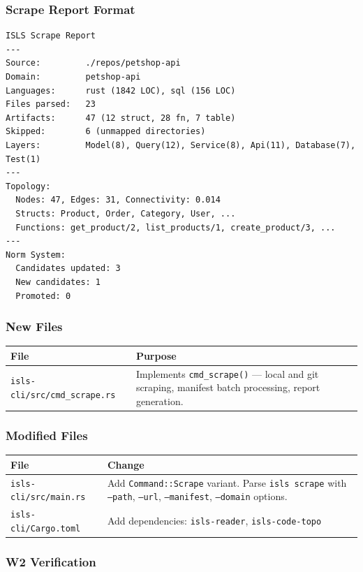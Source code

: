 \documentclass[11pt,a4paper]{article}
\begin{document}
\subsubsection{Scrape Report Format}

\begin{lstlisting}[style=bash]
ISLS Scrape Report
---
Source:         ./repos/petshop-api
Domain:         petshop-api
Languages:      rust (1842 LOC), sql (156 LOC)
Files parsed:   23
Artifacts:      47 (12 struct, 28 fn, 7 table)
Skipped:        6 (unmapped directories)
Layers:         Model(8), Query(12), Service(8), Api(11), Database(7), Test(1)
---
Topology:
  Nodes: 47, Edges: 31, Connectivity: 0.014
  Structs: Product, Order, Category, User, ...
  Functions: get_product/2, list_products/1, create_product/3, ...
---
Norm System:
  Candidates updated: 3
  New candidates: 1
  Promoted: 0
\end{lstlisting}

\subsubsection{New Files}

\begin{longtable}{lp{10cm}}
\toprule
\textbf{File} & \textbf{Purpose} \\
\midrule
\texttt{isls-cli/src/cmd\_scrape.rs}
  & Implements \texttt{cmd\_scrape()} --- local and git scraping,
    manifest batch processing, report generation. \\
\bottomrule
\end{longtable}

\subsubsection{Modified Files}

\begin{longtable}{lp{10cm}}
\toprule
\textbf{File} & \textbf{Change} \\
\midrule
\texttt{isls-cli/src/main.rs}
  & Add \texttt{Command::Scrape} variant. Parse \texttt{isls scrape}
    with \texttt{--path}, \texttt{--url}, \texttt{--manifest},
    \texttt{--domain} options. \\
\texttt{isls-cli/Cargo.toml}
  & Add dependencies: \texttt{isls-reader}, \texttt{isls-code-topo} \\
\bottomrule
\end{longtable}

\subsubsection{W2 Verification}
\end{document}
